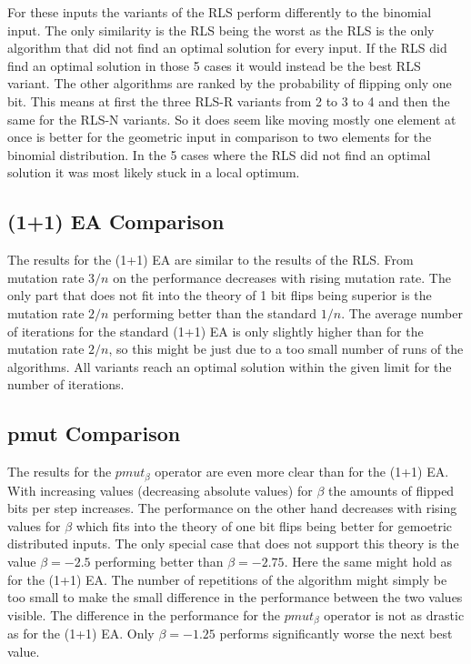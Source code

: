 

For these inputs the variants of the RLS perform differently to the binomial input.
The only similarity is the RLS being the worst as the RLS is the only algorithm that did not find an optimal solution for every input.
If the RLS did find an optimal solution in those 5 cases it would instead be the best RLS variant.
The other algorithms are ranked by the probability of flipping only one bit.
This means at first the three RLS-R variants from 2 to 3 to 4 and then the same for the RLS-N variants.
So it does seem like moving mostly one element at once is better for the geometric input in comparison to two elements for the binomial distribution.
In the 5 cases where the RLS did not find an optimal solution it was most likely stuck in a local optimum.

\subsection{(1+1) EA Comparison}




The results for the (1+1) EA are similar to the results of the RLS. From mutation rate $3/n$ on the performance decreases with rising mutation rate.
The only part that does not fit into the theory of 1 bit flips being superior is the mutation rate $2/n$ performing better than the standard $1/n$.
The average number of iterations for the standard (1+1) EA is only slightly higher than for the mutation rate $2/n$, so this might be just due to a too small number of runs of the algorithms.
All variants reach an optimal solution within the given limit for the number of iterations.
\subsection{pmut Comparison}




The results for the $pmut_\beta$ operator are even more clear than for the (1+1) EA.
With increasing values (decreasing absolute values) for $\beta$ the amounts of flipped bits per step increases.
The performance on the other hand decreases with rising values for $\beta$ which fits into the theory of one bit flips being better for gemoetric distributed inputs.
The only special case that does not support this theory is the value $\beta=-2.5$ performing better than $\beta=-2.75$.
Here the same might hold as for the (1+1) EA.
The number of repetitions of the algorithm might simply be too small to make the small difference in the performance between the two values visible.
The difference in the performance for the $pmut_\beta$ operator is not as drastic as for the (1+1) EA.
Only $\beta=-1.25$ performs significantly worse the next best value.


